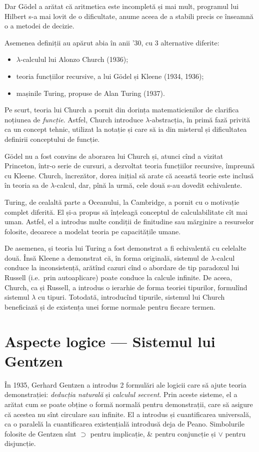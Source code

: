\documentclass[a4paper]{article}
\begin{document}
Dar G\"{o}del a arătat că aritmetica este incompletă și mai mult, programul
lui Hilbert s-a mai lovit de o dificultate, anume aceea de a stabili precis
ce înseamnă o  a metodei de decizie.

Asemenea definiții au apărut abia în anii '30, cu 3 alternative diferite:
\begin{itemize}
  \item $\lambda$-calculul lui Alonzo Church (1936);
  \item teoria funcțiilor recursive, a lui G\"{o}del și Kleene (1934, 1936);
  \item mașinile Turing, propuse de Alan Turing (1937).
\end{itemize}

Pe scurt, teoria lui Church a pornit din dorința matematicienilor de clarifica
noțiunea de \emph{funcție}. Astfel, Church introduce $\lambda$-abstracția,
în primă fază privită ca un concept tehnic, utilizat la notație și care să
ia din misterul și dificultatea definirii conceptului de funcție.

G\"{o}del nu a fost convins de aborarea lui Church și, atunci cînd a vizitat
Princeton, într-o serie de cursuri, a dezvoltat teoria funcțiilor recursive,
împreună cu Kleene. Church, încrezător, dorea inițial să arate că această
teorie este inclusă în teoria sa de $\lambda$-calcul, dar, pînă la urmă,
cele două s-au dovedit echivalente.

Turing, de cealaltă parte a Oceanului, la Cambridge, a pornit cu o motivație
complet diferită. El și-a propus să înțeleagă conceptul de calculabilitate
cît mai uman. Astfel, el a introdus multe condiții de finitudine sau mărginire
a resurselor folosite, deoarece a modelat teoria pe capacitățile umane.

De asemenea, și teoria lui Turing a fost demonstrat a fi echivalentă cu
celelalte două. Însă Kleene a demonstrat că, în forma originală, sistemul
de $\lambda$-calcul conduce la inconsistență, arătînd cazuri cînd o abordare
de tip paradoxul lui Russell (i.e.\ prin autoaplicare) poate conduce la
calcule infinite. De aceea, Church, ca și Russell, a introdus o ierarhie
de forma teoriei tipurilor, formulînd sistemul $\lambda$ cu tipuri. Totodată,
introducînd tipurile, sistemul lui Church beneficiază și de existența unei
forme normale pentru fiecare termen.



\section{Aspecte logice --- Sistemul lui Gentzen}
\indent\indent În 1935, Gerhard Gentzen a introdus 2 formulări ale logicii
care să ajute teoria demonstrației: \emph{deducția naturală} și \emph{calculul %
secvent}. Prin aceste sisteme, el a arătat cum se poate obține o formă
normală pentru demonstrații, care să asigure că acestea nu sînt circulare sau
infinite. El a introdus și cuantificarea universală, ca o paralelă la
cuantificarea existențială introdusă deja de Peano. Simbolurile folosite
de Gentzen sînt $ \supset $ pentru implicație, \& pentru conjuncție și
$ \lor $ pentru disjuncție.
\end{document}
